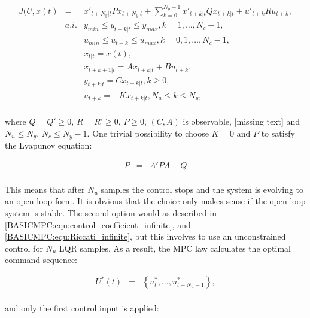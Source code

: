 		\begin{equation}
        \begin{array}{rcl}
				J(U,x(t)&=&x'_{t+N_y|t}Px_{t+N_y|t}+\sum^{N_y-1}_{k=0}x'_{t+k|t}Qx_{t+k|t}+u'_{t+k}Ru_{t+k},\\
				&a.i.&y_{min}\leq y_{t+k|t}\leq y_{max},k=1,\dots,N_c-1,\\
				&&u_{min}\leq u_{t+k}\leq u_{max},k=0,1,\dots,N_c-1,\\
				&&x_{t|t}=x(t),\\
				&&x_{t+k+1|t}=Ax_{t+k|t}+Bu_{t+k},\\
				&&y_{t+k|t}=Cx_{t+k|t}, k\geq0,\\
				&&u_{t+k}=-Kx_{t+k|t}, N_u\leq k\leq N_y,\\
        \end{array}
        \label{BASICMPC:equ:receiding_horison_problem}
    \end{equation}
		
		where $Q=Q'\geq0$, $R=R'\geq0$, $P\geq0$, $(C,A)$ is observable, [missing text] and $N_u\leq N_y$, $N_c\leq N_y-1$. One trivial possibility to choose $K=0$ and $P$ to satisfy the Lyapunov equation:
		
		\begin{equation}
        \begin{array}{rcl}
				P&=&A'PA+Q\\
        \end{array}
        \label{BASICMPC:equ:receiding_horison_Lyapunov}
    \end{equation}
		
		This means that after $N_u$ samples the control stops and the system is evolving to an open loop form. It is obvious that the choice only makes sense if the open loop system is stable. The second option would as described in \ref{BASICMPC:equ:control_coefficient_infinite}, and \ref{BASICMPC:equ:Riccati_infinite}, but this involves to use an unconstrained control for $N_u$ LQR samples. As a result, the MPC law calculates the optimal command sequence:
		
		\begin{equation}
        \begin{array}{rcl}
				U^*(t)&=&\left\{u^*_t,\dots,u^*_{t+N_u-1}\right\},\\
        \end{array}
        \label{BASICMPC:equ:receiding_optimal_sequence}
    \end{equation}
		
		and only the first control input is applied:
		
